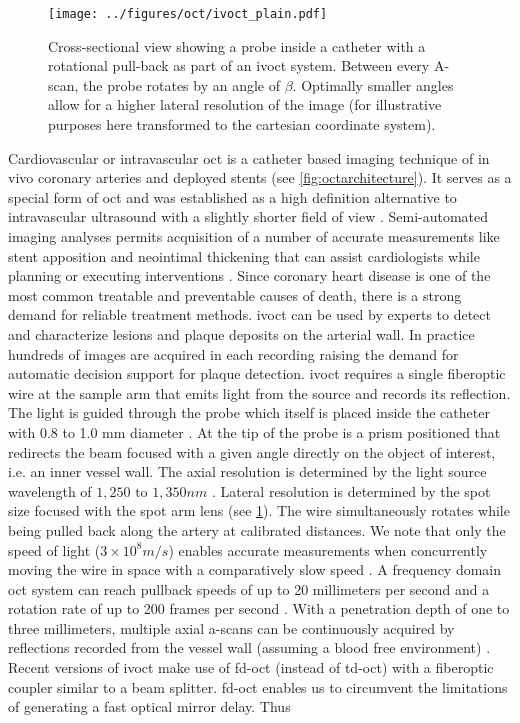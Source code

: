 \begin{figure}[hbt]
    \centering
    \texttt{[image: ../figures/oct/ivoct\_plain.pdf]}
    \caption[\acrshort{ivoct} catheter in vessel]{Cross-sectional view showing a probe inside a catheter with a rotational pull-back as part of an \acrshort{ivoct} system. Between every A-scan, the probe rotates by an angle of \( \beta \). Optimally smaller angles allow for a higher lateral resolution of the image (for illustrative purposes here transformed to the cartesian coordinate system).}
    \label{fig:ivoct}
\end{figure}
Cardiovascular or intravascular \acrshort{oct} is a catheter based imaging technique of in vivo coronary arteries and deployed stents (see \cref{fig:octarchitecture}). It serves as a special form of \acrshort{oct} and was established as a high definition alternative to intravascular ultrasound with a slightly shorter field of view \cite{IkKyungJang.2002, GuillermoJ.Tearney.2012}. Semi-automated imaging analyses permits acquisition of a number of accurate measurements like stent apposition and neointimal thickening that can assist cardiologists while planning or executing interventions \cite{HiramG.Bezerra.2009}. Since coronary heart disease is one of the most common treatable and preventable causes of death, there is a strong demand for reliable treatment methods. \Acrshort{ivoct} can be used by experts to detect and characterize lesions and plaque deposits on the arterial wall. In practice hundreds of images are acquired in each recording raising the demand for automatic decision support for plaque detection. \Acrshort{ivoct} requires a single fiberoptic wire at the sample arm that emits light from the source and records its reflection. \cite{HiramG.Bezerra.2009} The light is guided through the probe which itself is placed inside the catheter with 0.8 to 1.0 mm diameter \cite{HiramG.Bezerra.2009}. At the tip of the probe is a prism positioned that redirects the beam focused with a given angle directly on the object of interest, i.e. an inner vessel wall. The axial resolution is determined by the light source wavelength of \( 1,250 \text{ to } 1,350 nm \) \cite{HiramG.Bezerra.2009}. Lateral resolution is determined by the spot size focused with the spot arm lens (see \cref{fig:ivoct}). The wire simultaneously rotates while being pulled back along the artery at calibrated distances. We note that only the speed of light (\(3 \times 10^8 m/s\)) enables accurate measurements when concurrently moving the wire in space with a comparatively slow speed \cite{HiramG.Bezerra.2009}. A frequency domain \acrshort{oct} system can reach pullback speeds of up to 20 millimeters per second and a rotation rate of up to 200 frames per second \cite{HiramG.Bezerra.2009}. With a penetration depth of one to three millimeters, multiple axial \Glspl{a-scan} can be continuously acquired by reflections recorded from the vessel wall (assuming a blood free environment) \cite{Gessert.2018}. Recent versions of \acrshort{ivoct} make use of \acrshort{fd-oct} (instead of \acrshort{td-oct}) with a fiberoptic coupler similar to a beam splitter. \Acrshort{fd-oct} enables us to circumvent the limitations of generating a fast optical mirror delay. Thus 